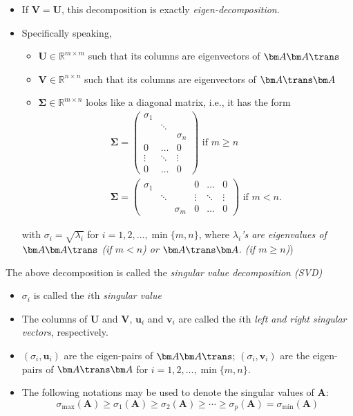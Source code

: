 \begin{remark}
\begin{itemize}
\item
If $\bm V=\bm U$, this decomposition is exactly \emph{eigen-decomposition}.
\item
Specifically speaking,
\begin{itemize}
\item
$\bm U\in\mathbb{R}^{m\times m}$ such that its columns are eigenvectors of $\bm A\bm A\trans$
\item
 $\bm V\in\mathbb{R}^{n\times n}$ such that its columns are eigenvectors of $\bm A\trans\bm A$
 \item
$\bm\Sigma\in\mathbb{R}^{m\times n}$ looks like a diagonal matrix, i.e., it has the form
\[
\begin{array}{ll}
\bm\Sigma=\begin{pmatrix}
\sigma_1&&\\&\ddots&\\&&\sigma_n\\
0&\dots&0\\\vdots&\ddots&\vdots\\0&\dots&0
\end{pmatrix}\text{ if $m\ge n$}\\
\bm\Sigma=\begin{pmatrix}
\sigma_1&&&0&\dots&0\\&\ddots&&\vdots&\ddots&\vdots\\&&\sigma_m&0&\dots&0\end{pmatrix}\text{ if $m< n$}.
\end{array}
\]
\end{itemize}
with $\sigma_i=\sqrt{\lambda_i}$ for $i=1,2,\dots,\min\{m,n\}$, where \textit{$\lambda_i$'s are eigenvalues of $\bm A\bm A\trans$ (if $m< n$) or $\bm A\trans\bm A$. (if $m\ge n$)})
\end{itemize}
\begin{definition}[SVD]
The above decomposition is called the \emph{singular value decomposition (SVD)}
\begin{itemize}
\item
$\sigma_i$ is called the $i$th \emph{singular value}
\item
The columns of $\bm U$ and $\bm V$, $\bm u_i$ and $\bm v_i$ are called the $i$th \emph{left and right singular vectors}, respectively.
\item
$(\sigma_i,\bm u_i)$ are the eigen-pairs of $\bm A\bm A\trans$; $(\sigma_i,\bm v_i)$ are the eigen-pairs of $\bm A\trans\bm A$ for $i=1,2,\dots,\min\{m,n\}$.
\item
The following notations may be used to denote the singular values of $\bm A$:
\[
\sigma_{\max}(\bm A)\ge\sigma_1(\bm A)\ge\sigma_2(\bm A)\ge\cdots\ge\sigma_p(\bm A)=\sigma_{\min}(\bm A)
\]
\end{itemize}
\end{definition}
\end{remark}
